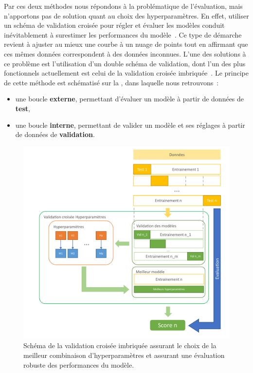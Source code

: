 Par ces deux méthodes nous répondons à la problématique de l'évaluation, mais n'apportons pas de solution quant au choix des hyperparamètres. En effet, utiliser un schéma de validation croisée pour régler et évaluer les modèles conduit inévitablement à surestimer les performances du modèle~\cite{Tsamardinos2014}. Ce type de démarche revient à ajuster au mieux une courbe à un nuage de points tout en affirmant que ces mêmes données correspondent à des données inconnues. L'une des solutions à ce problème est l'utilisation d'un double schéma de validation, dont l'un des plus fonctionnels actuellement est celui de la validation croisée imbriquée~\cite{Cawley2010}. Le principe de cette méthode est schématisé sur la , dans laquelle nous retrouvons~:
\begin{itemize}
    \item une boucle \textbf{externe}, permettant d'évaluer un modèle à partir de données de \textbf{test},
    \item une boucle \textbf{interne}, permettant de valider un modèle et ses réglages à partir de données de \textbf{validation}.
\end{itemize}\par
  
\begin{figure}[H]
    \centering
    \includegraphics[width=0.9\linewidth]{contents/chapter_3/resources/scheme_hyperparameter_process.pdf}
    \caption{Schéma de la validation croisée imbriquée assurant le choix de la meilleur combinaison d'hyperparamètres et assurant une évaluation robuste des performances du modèle.}
    \label{fig:scheme_hyperparameter_process}
\end{figure}\par

